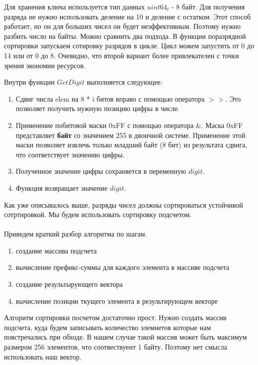 Для хранения ключа используется тип данных $uint64_t$ - 8 байт.
Для получения разряда не нужно использовать деление на 10 и деление с остатком. Этот способ работает, 
но он для больших чисел он будет неэффективным. Поэтому нужно разбить число на байты. Можно сравнить два подхода.
В функции поразрядной сортировки запускаем сотировку разрядов в цикле. Цикл можем запустить от 0 до 14 или от 0 до 8.
Очевидно, что второй вариант более привлекателен с точки зрения экономии ресурсов.

Внутри функции $GetDigit$ выполняется следующее:
\begin{enumerate}
	\item Сдвиг числа elem на 8 * i битов вправо с помощью оператора \(>>\). Это позволяет получить нужную позицию цифры в числе.
	\item Применение побитовой маски 0xFF с помощью оператора \&. Маска 0xFF представляет \textbf{байт} со значением 255 в двоичной системе. Применение этой маски позволяет извлечь только младший байт (8 бит) из результата сдвига, что соответствует значению цифры.
	\item Полученное значение цифры сохраняется в переменную $digit$.
	\item Функция возвращает значение $digit$.
\end{enumerate}


Как уже описывалось выше, разряды чисел должны сортироваться устойчивой сотртировкой. Мы будем использовать сортировку подсчетом.\\\\

Приведем краткий разбор алгоритма по шагам.
\begin{enumerate}
	\item создание массива подсчета
	\item вычисление префикс-суммы для каждого элемента в массиве подсчета
	\item создание результырующего вектора
	\item вычисление позиции ткущего элемента в результирующем векторе
\end{enumerate}


Алгоритм сортировки посчетом достаточно прост. Нужно создать массив подсчета, 
куда будем записывать количество элемнетов которые нам повстречались при обходе.
В нашем случае такой массив может быть максимум размером 256 элементов, что соотвествуент 1 байту.
Поэтому нет смысла использовать наш вектор.\\\\

